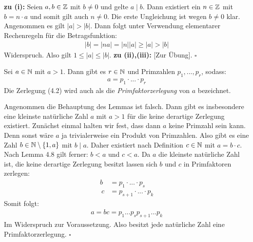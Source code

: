 \begin{proof*}
    \textbf{zu (i):} \newline
    Seien $a,b \in \mathbb{Z}$ mit $b \neq 0$ und gelte $a \mid b$. Dann existiert ein $n \in \mathbb{Z}$ mit $b = n \cdot a$ und somit gilt auch $n \neq 0$. Die erste Ungleichung ist wegen $b \neq 0$ klar. Angenommen es gilt $\lvert a \rvert > \lvert b \rvert$. 
    Dann folgt unter Verwendung elementarer Rechenregeln für die Betragsfunktion: 
    \begin{align*}
        \lvert b \rvert = \lvert n a \rvert = \lvert n \rvert \lvert a \rvert \geq \lvert a \rvert > \lvert b \rvert
    \end{align*}
    Widerspruch. Also gilt $1 \leq \lvert a \rvert \leq \lvert b \rvert$.
    \newline 
    \textbf{zu (ii),(iii):} [Zur Übung]. \hfill $\square$
\end{proof*}

\begin{lemma}
    Sei $a \in \mathbb{N}$ mit $a > 1$. Dann gibt es $r \in \mathbb{N}$ und Primzahlen $p_1,...,p_r$, sodass: 
    \begin{align}
        a = p_1 \cdot ... \cdot p_r
    \end{align}
    Die Zerlegung (4.2) wird auch als die \textit{Primfaktorzerlegung} von $a$ bezeichnet. 
\end{lemma}

\begin{proof*}%
    Angenommen die Behauptung des Lemmas ist falsch. Dann gibt es insbesondere eine kleinste natürliche Zahl $a$ mit $a>1$ für die keine derartige Zerlegung existiert. 
    Zunächst einmal halten wir fest, dass dann $a$ keine Primzahl sein kann. Denn sonst wäre $a$ ja trivialerweise ein Produkt von Primzahlen. 
    Also gibt es eine Zahl $b \in \mathbb{N} \setminus \{1,a\}$ mit $b \mid a$. Daher existiert nach Definition $c \in \mathbb{N}$ mit $a = b \cdot c$. Nach Lemma 4.8 gilt ferner: 
    $b < a$ und $c < a$. Da $a$ die kleinste natürliche Zahl ist, die keine derartige Zerlegung besitzt lassen sich $b$ und $c$ in Primfaktoren zerlegen: 
    \begin{align*}
        b &= p_1 \cdot ... \cdot p_s \\\
        c &= p_{s+1} \cdot ... \cdot p_k
    \end{align*}
    Somit folgt: 
    \begin{align*}
        a = b c = p_1 ... p_s p_{s+1} ... p_k 
    \end{align*}
    Im Widerspruch zur Voraussetzung. Also besitzt jede natürliche Zahl eine Primfaktorzerlegung. \hfill $\square$
\end{proof*}

